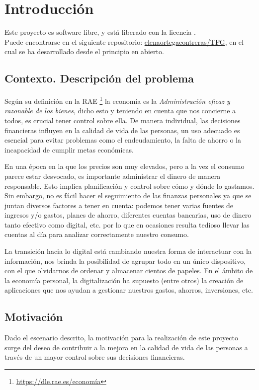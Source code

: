 \chapter{Introducción}
Este proyecto es software libre, y está liberado con la licencia \cite{gplv3}.\\

Puede encontrarse en el siguiente repositorio:
\href{https://github.com/elenaortegacontreras/TFG}{elenaortegacontreras/TFG}, 
en el cual se ha desarrollado desde el principio en abierto.

\section{Contexto. Descripción del problema}

Según su definición en la RAE \footnote{\url{https://dle.rae.es/economía}} la economía es la 
\textit{Administración eficaz y razonable de los bienes}, dicho esto y teniendo en 
cuenta que nos concierne a todos, es crucial tener control sobre ella. 
De manera individual, las decisiones financieras influyen en la calidad de vida de las personas,
un uso adecuado es esencial para evitar problemas como el endeudamiento, la 
falta de ahorro o la incapacidad de cumplir metas económicas.

En una época en la que los precios son muy elevados, pero a la vez el consumo parece estar 
desvocado, es importante administrar el dinero de manera responsable. Esto 
implica planificación y control sobre cómo y dónde lo gastamos.
Sin embargo, no es fácil hacer el seguimiento de las finanzas personales ya que se 
juntan diversos factores a tener en cuenta: podemos tener varias fuentes de ingresos y/o 
gastos, planes de ahorro, diferentes cuentas bancarias, uso de dinero tanto 
efectivo como digital, etc. por lo que en ocasiones resulta tedioso 
llevar las cuentas al día para analizar correctamente nuestro consumo.

La transición hacia lo digital está cambiando nuestra forma de interactuar con 
la información, nos brinda la posibilidad de agrupar todo en un 
único dispositivo, con el que olvidarnos de ordenar y almacenar cientos de papeles.
En el ámbito de la economía personal, la digitalización ha supuesto (entre 
otros) la creación de aplicaciones que nos ayudan a gestionar nuestros 
gastos, ahorros, inversiones, etc.

\section{Motivación}
Dado el escenario descrito, la motivación para la realización de este proyecto surge del deseo 
de contribuir a la mejora en la calidad de vida de las personas a través de un mayor control 
sobre sus decisiones financieras.

